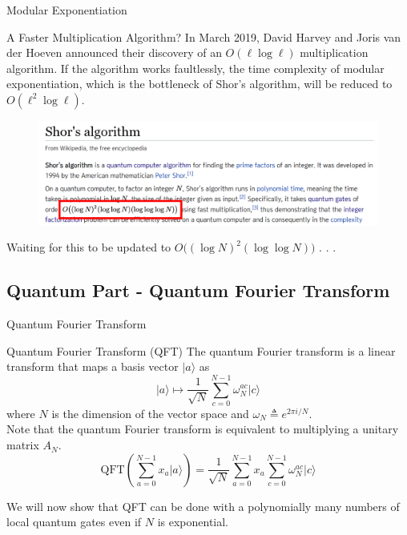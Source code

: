 \documentclass{beamer}
\newcommand{\mrm}[1]{\mathrm{#1}}
\renewcommand{\:}{\text{ }}
\begin{document}
    \begin{frame}{Modular Exponentiation}
        \begin{block}{A Faster Multiplication Algorithm? \href{https://projecteuclid.org/journals/annals-of-mathematics/volume-193/issue-2/Integer-multiplication-in-time-Onmathrmlog-n/10.4007/annals.2021.193.2.4.full}{}}
            \small
            In March 2019, David Harvey and Joris van der Hoeven announced their discovery of an $O(\ell \log \ell)$ multiplication algorithm.
            If the algorithm works faultlessly, the time complexity of modular exponentiation, which is the bottleneck of Shor's algorithm, will be reduced to $O(\ell^2 \log \ell)$.
        \end{block}
        \begin{figure}
            \centering
            \includegraphics[width=\linewidth]{shor_wikipedia.png}
        \end{figure}
        \footnotesize \vspace*{-1em}
        \centerline{Waiting for this to be updated to $O\big( (\log N)^2 (\log \log N) \big)$ . . .}
    \end{frame}

    \subsection{Quantum Part - Quantum Fourier Transform}
    \begin{frame}{Quantum Fourier Transform}
        \begin{block}{Quantum Fourier Transform (QFT)}
            The \alert{quantum Fourier transform} is a linear transform that maps a basis vector $\vert a \rangle$ as
            \[ \vert a \rangle \mapsto \frac{1}{\sqrt{N}} \sum_{c=0}^{N-1} \omega_N^{ac} \vert c \rangle \]
            where $N$ is the dimension of the vector space and $\omega_N \triangleq e^{2\pi i / N}$. \\[.5em]
            Note that the quantum Fourier transform is equivalent to multiplying a unitary matrix $A_N$.
            \[ \mrm{QFT}\left( \sum_{a=0}^{N-1} x_a \vert a \rangle \right) = \frac{1}{\sqrt{N}} \sum_{a=0}^{N-1} x_a \sum_{c=0}^{N-1} \omega_N^{ac} \vert c \rangle \]
        \end{block}
        \begin{alertblock}{}
            We will now show that QFT can be done with a polynomially many numbers of local quantum gates even if $N$ is exponential.
        \end{alertblock}
    \end{frame}
\end{document}
